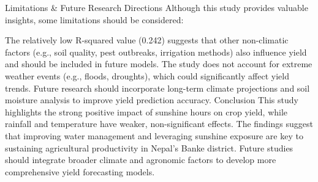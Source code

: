 Limitations \& Future Research Directions
Although this study provides valuable insights, some limitations should be considered:

The relatively low R-squared value (0.242) suggests that other non-climatic factors (e.g., soil quality, pest outbreaks, irrigation methods) also influence yield and should be included in future models.
The study does not account for extreme weather events (e.g., floods, droughts), which could significantly affect yield trends.
Future research should incorporate long-term climate projections and soil moisture analysis to improve yield prediction accuracy.
Conclusion
This study highlights the strong positive impact of sunshine hours on crop yield, while rainfall and temperature have weaker, non-significant effects. The findings suggest that improving water management and leveraging sunshine exposure are key to sustaining agricultural productivity in Nepal’s Banke district. Future studies should integrate broader climate and agronomic factors to develop more comprehensive yield forecasting models.




 